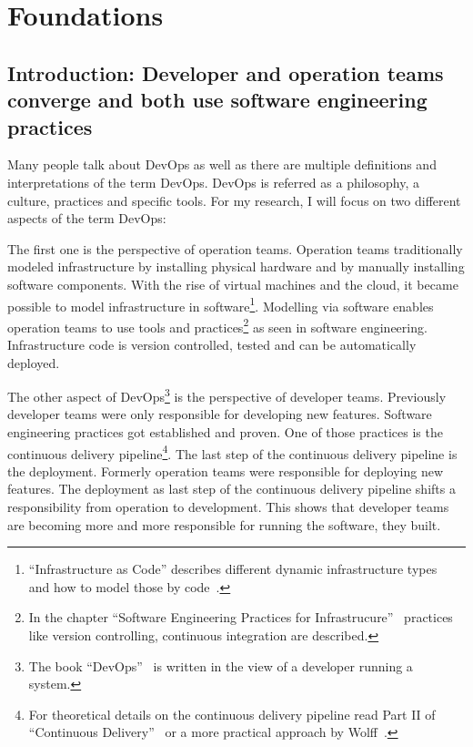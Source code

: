 \part{Foundations}

\chapter{Introduction: Developer and operation teams converge and both use software engineering practices}

Many people talk about DevOps as well as there are multiple definitions and interpretations of the term DevOps. DevOps is referred as a philosophy, a culture, practices and specific tools. For my research, I will focus on two different aspects of the term DevOps:

The first one is the perspective of operation teams. Operation teams traditionally modeled infrastructure by installing physical hardware and by manually installing software components. With the rise of virtual machines and the cloud, it became possible to model infrastructure in software\footnote{``Infrastructure as Code'' describes different dynamic infrastructure types~\cite[p. 30]{infra_as_code} and how to model those by code~\cite[p. 42]{infra_as_code}.}. Modelling via software enables operation teams to use tools and practices\footnote{In the chapter ``Software Engineering Practices for Infrastrucure''~\cite[p. 179-194]{infra_as_code} practices like version controlling, continuous integration are described.} as seen in software engineering. Infrastructure code is version controlled, tested and can be automatically deployed.

The other aspect of DevOps\footnote{The book ``DevOps''~\cite{devops} is written in the view of a developer running a system.} is the perspective of developer teams. Previously developer teams were only responsible for developing new features. Software engineering practices got established and proven. One of those practices is the continuous delivery pipeline\footnote{For theoretical details on the continuous delivery pipeline read Part II of ``Continuous Delivery''~\cite[p. 103-140]{continuous_delivery} or a more practical approach by Wolff~\cite{continuous_delivery2}.}. The last step of the continuous delivery pipeline is the deployment. Formerly operation teams were responsible for deploying new features. The deployment as last step of the continuous delivery pipeline shifts a responsibility from operation to development. This shows that developer teams are becoming more and more responsible for running the software, they built.

